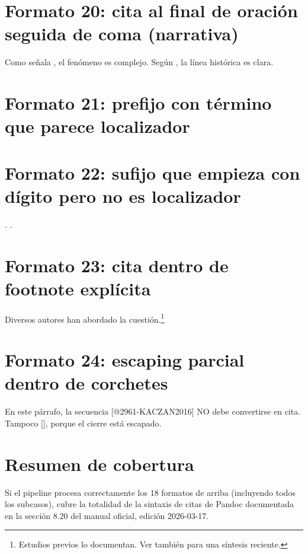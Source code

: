 \documentclass{article}
\begin{document}
\section{Formato 20: cita al final de oración seguida de coma (narrativa)}
Como señala \textcite{2961-KACZAN2016}, el fenómeno es complejo. Según \textcite{3041-PINEAU1999}, la línea histórica es clara.


\section{Formato 21: prefijo con término que parece localizador}
\autocite[cap. 3 de][]{2961-KACZAN2016}\autocite[vol. 1 de][p. 45]{3036-ORBUCH2020}


\section{Formato 22: sufijo que empieza con dígito pero no es localizador}
\autocite[2020 es un año clave para el estudio]{2961-KACZAN2016}. \autocite[1999 vio la primera edición]{3041-PINEAU1999}.


\section{Formato 23: cita dentro de footnote explícita}
Diversos autores han abordado la cuestión.\footnote{Estudios previos
  \autocite{2961-KACZAN2016,3041-PINEAU1999}
  lo documentan. Ver también
  \textcite[cap. 2]{3036-ORBUCH2020}
  para una síntesis reciente.}


\section{Formato 24: escaping parcial dentro de corchetes}
En este párrafo, la secuencia [@2961-KACZAN2016] NO debe convertirse en cita. Tampoco [\textcite{3041-PINEAU1999}], porque el cierre está escapado.


\section{Resumen de cobertura}
Si el pipeline procesa correctamente los 18 formatos de arriba (incluyendo todos los subcasos), cubre la totalidad de la sintaxis de citas de Pandoc documentada en la sección 8.20 del manual oficial, edición 2026-03-17.



\printbibliography
\end{document}
